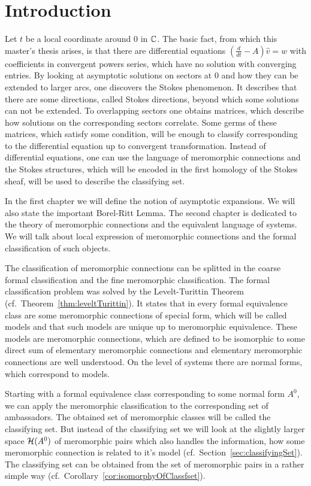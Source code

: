 \chapter{Introduction}
Let $t$ be a local coordinate around $0$ in $\mathbb{C}$.
The basic fact, from which this master's thesis arises, is that there are
differential equations $(\frac{d}{dt}-A)\hat v=w$ with coefficients in
convergent powers series, which have no solution with converging entries.
By looking at asymptotic solutions on sectors at $0$ and how they can be extended to
larger arcs, one discovers the Stokes phenomenon. It describes that there are
some directions, called Stokes directions, beyond which some solutions can not
be extended.
To overlapping sectors one obtains matrices, which describe how solutions on the
corresponding sectors correlate.
Some germs of these matrices, which satisfy some condition, will be enough to
classify corresponding to the differential equation up to convergent
transformation.
Instead of differential equations, one can use the language of meromorphic
connections and the Stokes structures, which will be encoded in the first
homology of the Stokes sheaf, will be used to describe the classifying set.

In the first chapter we will define the notion of asymptotic expansions. We will
also state the important Borel-Ritt Lemma.
The second chapter is dedicated to the theory of meromorphic connections and the
equivalent language of systems. We will talk about local expression of
meromorphic connections and the formal classification of such objects.

The classification of meromorphic connections can be splitted in the coarse
formal classification and the fine meromorphic classification.
The formal classification problem was solved by the Levelt-Turittin Theorem
(cf.\ Theorem~\ref{thm:leveltTurittin}). It states that in every formal
equivalence class are some meromorphic connections of special form, which will
be called models and that such models are unique up to meromorphic equivalence.
These models are meromorphic connections, which are defined to be isomorphic to
some direct sum of elementary meromorphic connections and elementary
meromorphic connections are well understood.
On the level of systems there are normal forms, which correspond to models.

Starting with a formal equivalence class corresponding to some normal form
$A^0$, we can apply the meromorphic classification to the corresponding set of
ambassadors.
The obtained set of meromorphic classes will be called the classifying set. But
instead of the classifying set we will look at the slightly larger space
$\mathcal{H}(A^0)$ of meromorphic pairs which also handles the information, how some
meromorphic connection is related to it's model
(cf.\ Section~\ref{sec:classifyingSet}).
The classifying set can be obtained from the set of meromorphic pairs in a
rather simple way (cf.\ Corollary~\ref{cor:isomorphyOfClassfset}).

